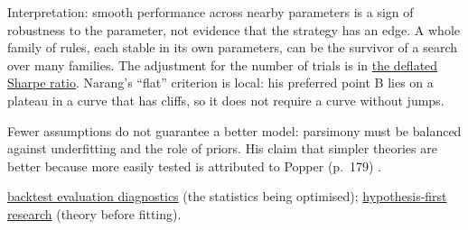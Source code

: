 \begin{qfpitfall}
 Interpretation: smooth performance across nearby parameters is a sign of robustness to the parameter, not evidence that the strategy has an edge. A whole family of rules, each stable in its own parameters, can be the survivor of a search over many families. The adjustment for the number of trials is in \hyperref[meth:deflated-sharpe-ratio]{the deflated Sharpe ratio}. Narang's ``flat'' criterion is local: his preferred point B lies on a plateau in a curve that has cliffs, so it does not require a curve without jumps.

 Fewer assumptions do not guarantee a better model: parsimony must be balanced against underfitting and the role of priors. His claim that simpler theories are better because more easily tested is attributed to Popper (p.~179) .

 \hyperref[meth:backtest-evaluation-diagnostics]{backtest evaluation diagnostics} (the statistics being optimised); \hyperref[meth:hypothesis-driven-strategy-research]{hypothesis-first research} (theory before fitting).

\end{qfpitfall}

